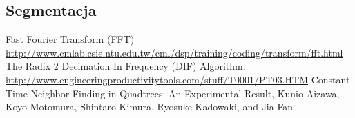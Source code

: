 \documentclass{classrep}
\begin{document}
\subsection{Segmentacja}



\begin{thebibliography}{8}

 Fast Fourier Transform (FFT) \url{http://www.cmlab.csie.ntu.edu.tw/cml/dsp/training/coding/transform/fft.html}
 The Radix 2 Decimation In Frequency (DIF) Algorithm.  \url{http://www.engineeringproductivitytools.com/stuff/T0001/PT03.HTM}
 Constant Time Neighbor Finding in Quadtrees: An Experimental Result, Kunio Aizawa, Koyo Motomura, Shintaro Kimura, Ryosuke Kadowaki, and Jia Fan
\end{thebibliography}
\end{document}
